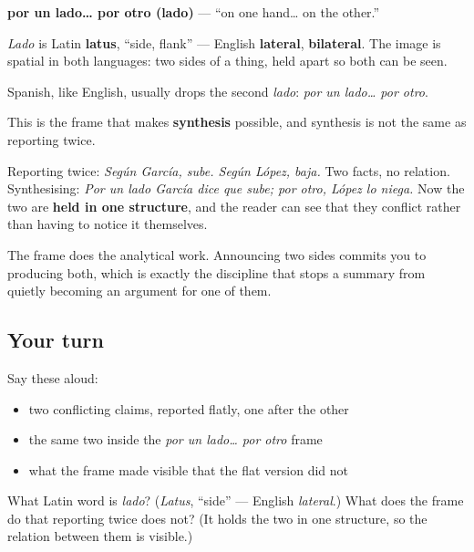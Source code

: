 \begin{cousinweb}
\textbf{por un lado… por otro (lado)} — \textquotedblleft{}on one hand… on the other.\textquotedblright{}

\emph{Lado} is Latin \textbf{latus}, \textquotedblleft{}side, flank\textquotedblright{} — English \textbf{lateral}, \textbf{bilateral}. The image is spatial in both languages: two sides of a thing, held apart so both can be seen.

Spanish, like English, usually drops the second \emph{lado}: \emph{por un lado… por otro}.
\end{cousinweb}

\begin{grammarlens}[title={What you've built}]
This is the frame that makes \textbf{synthesis} possible, and synthesis is not the same as reporting twice.

Reporting twice: \emph{Según García, sube. Según López, baja.} Two facts, no relation. Synthesising: \emph{Por un lado García dice que sube; por otro, López lo niega.} Now the two are \textbf{held in one structure}, and the reader can see that they conflict rather than having to notice it themselves.

The frame does the analytical work. Announcing two sides commits you to producing both, which is exactly the discipline that stops a summary from quietly becoming an argument for one of them.
\end{grammarlens}

\subsection*{Your turn}
Say these aloud:

\begin{itemize}
\raggedright
  \item two conflicting claims, reported flatly, one after the other
  \item the same two inside the \emph{por un lado… por otro} frame
  \item what the frame made visible that the flat version did not
\end{itemize}

\begin{tcolorbox}[breakable,colback=teal!4,colframe=teal!35!black,title={Before you move on}]
What Latin word is \emph{lado}? (\emph{Latus}, \textquotedblleft{}side\textquotedblright{} — English \emph{lateral}.) What does the frame do that reporting twice does not? (It holds the two in one structure, so the relation between them is visible.)
\end{tcolorbox}

